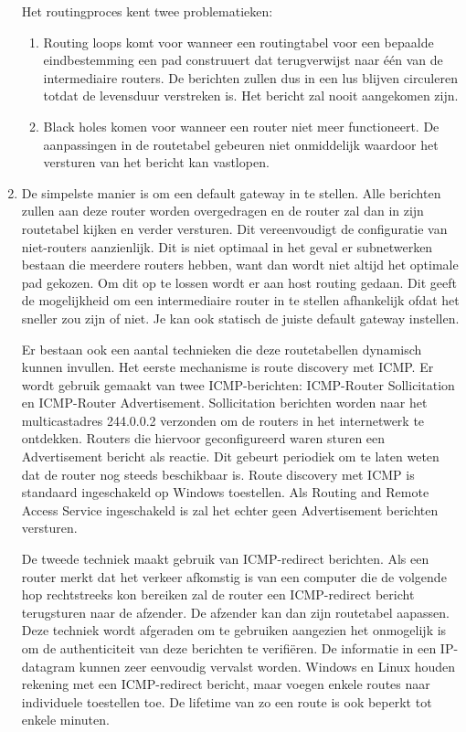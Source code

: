 \documentclass{report}
\begin{document}
\begin{enumerate}
	Het routingproces kent twee problematieken:
	\begin{enumerate}
		\item Routing loops komt voor wanneer een routingtabel voor een bepaalde eindbestemming een pad construuert dat terugverwijst naar één van de intermediaire routers. De berichten zullen dus in een lus blijven circuleren totdat de levensduur verstreken is. Het bericht zal nooit aangekomen zijn.
		\item Black holes komen voor wanneer een router niet meer functioneert. De aanpassingen in de routetabel gebeuren niet onmiddelijk waardoor het versturen van het bericht kan vastlopen.
	\end{enumerate}
	
	\item De simpelste manier is om een default gateway in te stellen. Alle berichten zullen aan deze router worden overgedragen en de router zal dan in zijn routetabel kijken en verder versturen. Dit vereenvoudigt de configuratie van niet-routers aanzienlijk. Dit is niet optimaal in het geval er subnetwerken bestaan die meerdere routers hebben, want dan wordt niet altijd het optimale pad gekozen. Om dit op te lossen wordt er aan host routing gedaan. Dit geeft de mogelijkheid om een intermediaire router in te stellen afhankelijk ofdat het sneller zou zijn of niet. Je kan ook statisch de juiste default gateway instellen.
	
	Er bestaan ook een aantal technieken die deze routetabellen dynamisch kunnen invullen. Het eerste mechanisme is route discovery met ICMP. Er wordt gebruik gemaakt van twee ICMP-berichten: ICMP-Router Sollicitation en ICMP-Router Advertisement. Sollicitation berichten worden naar het multicastadres 244.0.0.2 verzonden om de routers in het internetwerk te ontdekken. Routers die hiervoor geconfigureerd waren sturen een Advertisement bericht als reactie. Dit gebeurt periodiek om te laten weten dat de router nog steeds beschikbaar is. Route discovery met ICMP is standaard ingeschakeld op Windows toestellen. Als Routing and Remote Access Service ingeschakeld is zal het echter geen Advertisement berichten versturen.
	
	De tweede techniek maakt gebruik van ICMP-redirect berichten. Als een router merkt dat het verkeer afkomstig is van een computer die de volgende hop rechtstreeks kon bereiken zal de router een ICMP-redirect bericht terugsturen naar de afzender. De afzender kan dan zijn routetabel aapassen. Deze techniek wordt afgeraden om te gebruiken aangezien het onmogelijk is om de authenticiteit van deze berichten te verifiëren. De informatie in een IP-datagram kunnen zeer eenvoudig vervalst worden. Windows en Linux houden rekening met een ICMP-redirect bericht, maar voegen enkele routes naar individuele toestellen toe. De lifetime van zo een route is ook beperkt tot enkele minuten.
	

\end{enumerate}
\end{document}
